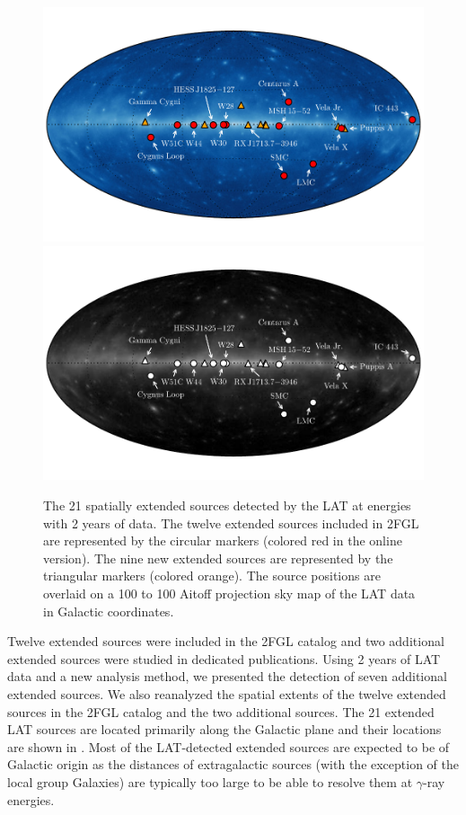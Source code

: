  \begin{figure}[htbp]
      \ifcolorfigure
      \includegraphics{summary_plots/allsky_extended_sources_color.pdf}
      \else
      \includegraphics{summary_plots/allsky_extended_sources_bw.pdf}
      \fi
      \caption{The 21
      spatially extended sources detected by the LAT
      at \gev energies 
      with 2 years of data.  The twelve extended sources included in
      2FGL are represented by the circular markers (colored red in the online
      version).  The nine new extended sources are represented by
      the triangular markers (colored orange).
      The source positions are overlaid on a 100 \mev to 100 \gev 
      Aitoff projection sky map of the LAT data in Galactic coordinates.
}
  \end{figure}


Twelve extended sources were included in the 2FGL catalog and two additional extended
sources were studied in dedicated publications.  Using 2 years of
LAT data and a new analysis method, we presented the detection of seven
additional extended sources.  We also reanalyzed the spatial extents of the
twelve extended sources in the 2FGL catalog and the two additional sources.  The 21
extended LAT sources are located primarily along the Galactic plane
and their locations are shown in .
Most of the LAT-detected extended sources are expected to be of Galactic
origin as the distances of extragalactic sources (with the exception of
the local group Galaxies) are typically too large to be able to resolve
them at $\gamma$-ray energies.


